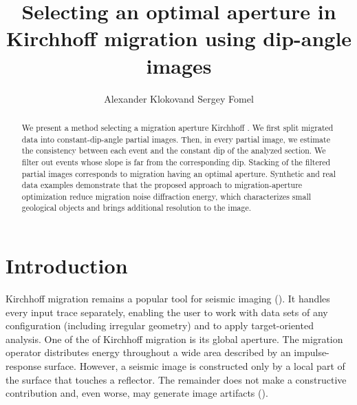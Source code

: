 \makeatletter
\renewcommand{\thesubfigure}{\alph{subfigure}}
\renewcommand{\@thesubfigure}{(\alph{subfigure})\hskip\subfiglabelskip}
\renewcommand{\@@thesubfigure}{(\alph{subfigure})}
\makeatother

\title{Selecting an optimal aperture in Kirchhoff migration using dip-angle images}

\renewcommand{\thefootnote}{\fnsymbol{footnote}} 


\author{Alexander Klokov\footnotemark[1] and Sergey Fomel\footnotemark[1]}

\address {
\footnotemark[1]Bureau of Economic Geology, 
Jackson School of Geosciences, 
The University of Texas at Austin, 
University Station, Box X, 
Austin, TX 78713-8924, 
USA 
}

\begin{abstract}
We present a method  selecting a migration aperture  Kirchhoff .
We first split migrated data into constant-dip-angle partial images. Then,
in every partial image, we estimate the consistency between each event and the constant dip of the analyzed
section. We filter out events whose slope is far from the corresponding dip. Stacking of the filtered
partial images corresponds to migration having an optimal aperture. Synthetic and real data examples
demonstrate that the proposed approach to migration-aperture optimization  reduce migration noise 
 diffraction energy, which characterizes small geological objects and brings additional resolution to the image. 
\end{abstract}

\section{Introduction}
Kirchhoff migration remains a popular tool for seismic imaging (\citealp[]{leveille11}).
It handles every input trace separately, enabling the user to work with data sets of any configuration (including
irregular geometry) and to apply target-oriented analysis. One of the  of Kirchhoff migration 
is its global aperture. The migration operator distributes energy throughout a wide area described by 
an impulse-response surface. However, a seismic image is constructed only by a local part of the surface that
touches a reflector. The remainder does not make a constructive contribution and, even worse, may generate
image artifacts (\citealp[]{sun98,hertweck03}).

